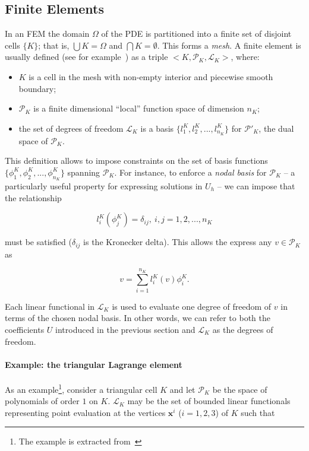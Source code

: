 \subsection{Finite Elements}
In an FEM the domain $\Omega$ of the PDE is partitioned into a finite set of disjoint cells $\lbrace K \rbrace$; that is, $\bigcup K = \Omega$ and $\bigcap K = \emptyset$. This forms a {\em mesh}. A finite element is usually defined (see for example~\cite{brenner-and-scott}) as a triple ${<}K,\mathcal{P}_K,\mathcal{L}_K{>}$, where:
\begin{itemize}
\item $K$ is a cell in the mesh with non-empty interior and piecewise smooth boundary;
\item $\mathcal{P}_K$ is a finite dimensional ``local'' function space of dimension $n_K$;
\item the set of degrees of freedom $\mathcal{L}_K$ is a basis $\lbrace l_1^K, l_2^K, ..., l_{n_K}^K\rbrace$ for $\mathcal{P}'_K$, the dual space of $\mathcal{P}_K$. 
\end{itemize}
This definition allows to impose constraints on the set of basis functions $\lbrace \phi_1^K, \phi_2^K, ..., \phi_{n_K}^K\rbrace$ spanning $\mathcal{P}_K$. For instance, to enforce a {\em nodal basis} for $\mathcal{P}_K$ -- a particularly useful property for expressing solutions in $U_h$ -- we can impose that the relationship

\begin{equation}
l_i^K(\phi_j^K) = \delta_{ij},\ i,j = 1,2,...,n_K
\end{equation}

must be satisfied ($\delta_{ij}$ is the Kronecker delta). This allows the express any $v \in \mathcal{P}_K$ as

\begin{equation}
v = \sum_{i=1}^{n_K} l_i^K(v) \phi_i^K.
\end{equation}

Each linear functional in $\mathcal{L}_K$ is used to evaluate one degree of freedom of $v$ in terms of the chosen nodal basis. In other words, we can refer to both the coefficients $U$ introduced in the previous section and $\mathcal{L}_K$ as the degrees of freedom.

\paragraph{Example: the triangular Lagrange element}
As an example\footnote{The example is extracted from~\cite{fenics-book}}, consider a triangular cell $K$ and let $\mathcal{P}_K$ be the space of polynomials of order $1$ on $K$. $\mathcal{L}_K$ may be the set of bounded linear functionals representing point evaluation at the vertices $\boldsymbol{x}^i$ ($i=1,2,3$) of $K$ such that

